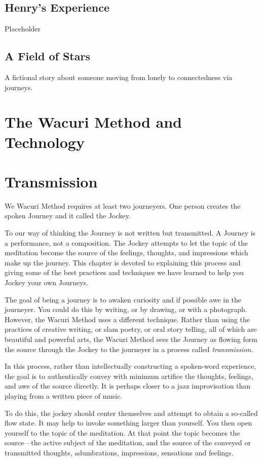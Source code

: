 \documentclass[12pt]{book}
\begin{document}
\section{Henry's Experience}

Placeholder 

\section{A Field of Stars}

A fictional story about someone moving from lonely to connectedness via journeys.
\chapter{The Wacuri Method and Technology}

\chapter{Transmission}

We Wacuri Method requires at least two journeyers. One person creates the
spoken Journey and it called the Jockey.

To our way of thinking the Journey is not written but transmitted.
A Journey is a performance, not a composition.
The Jockey attempts to let the topic of the meditation become the
source of the feelings, thoughts, and impressions which make up the journey.
This chapter is devoted to explaining this process and giving some of the
best practices and techniques we have learned to help you Jockey your own
Journeys.

The goal of being a journey is to awaken curiosity and if possible awe
in the journeyer. You could do this by writing, or by drawing, or
with a photograph. However, the Wacuri Method uses a different
technique. Rather than using the practices of creative writing,
or slam poetry, or oral story telling, all of which are beautiful
and powerful arts, the Wacuri Method sees the Journey as flowing
form the source through the Jockey to the journeyer in a process
called {\em transmission}.

In this process, rather than intellectually constructing a spoken-word
experience, the goal is to authentically convey with minimum artifice
the thoughts, feelings, and awe of the source directly. It is
perhaps closer to a jazz improvisation than playing from a
written piece of music.

To do this, the jockey should center themselves and attempt
to obtain a so-called flow state. It may help to invoke something
larger than yourself. You then open yourself to the
topic of the meditation. At that point the topic becomes
the source---the active subject of the meditation, and
the source of the conveyed or transmitted thoughts, adumbrations,
impressions, sensations and feelings.
\end{document}
